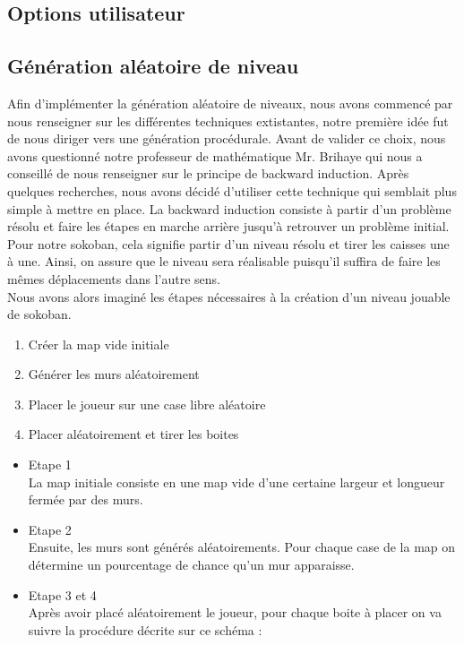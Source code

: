 \documentclass[../main.tex]{subfiles}
\begin{document}
\subsection{Options utilisateur}

\subsection{Génération aléatoire de niveau}
Afin d'implémenter la génération aléatoire de niveaux, nous avons commencé par nous renseigner sur les différentes techniques extistantes, notre première idée fut de nous diriger vers une génération procédurale.
Avant de valider ce choix, nous avons questionné notre professeur de mathématique Mr. Brihaye qui nous a conseillé de nous renseigner sur le principe de backward induction.
Après quelques recherches, nous avons décidé d'utiliser cette technique qui semblait plus simple à mettre en place.
La backward induction consiste à partir d'un problème résolu et faire les étapes en marche arrière jusqu'à retrouver un problème initial.
Pour notre sokoban, cela signifie partir d'un niveau résolu et tirer les caisses une à une.
Ainsi, on assure que le niveau sera réalisable puisqu'il suffira de faire les mêmes déplacements dans l'autre sens.\\
Nous avons alors imaginé les étapes nécessaires à la création d'un niveau jouable de sokoban.
\begin{enumerate}
	\item Créer la map vide initiale 
	\item Générer les murs aléatoirement
	\item Placer le joueur sur une case libre aléatoire
	\item Placer aléatoirement et tirer les boites
\end{enumerate}
\begin{itemize}
	\item Etape 1\\
		  La map initiale consiste en une map vide d'une certaine largeur et longueur fermée par des murs.
	\item Etape 2\\
		  Ensuite, les murs sont générés aléatoirements. Pour chaque case de la map on détermine un pourcentage de chance qu'un mur apparaisse.
	\item Etape 3 et 4\\
		  Après avoir placé aléatoirement le joueur, pour chaque boite à placer on va suivre la procédure décrite sur ce schéma :\\
\end{itemize}
\end{document}
